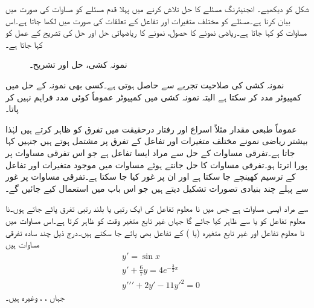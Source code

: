 شکل  کو دیکھیے۔ انجنیئرنگ مسئلے کا حل تلاش کرنے میں پہلا قدم مسئلے کو مساوات کی صورت میں بیان کرنا ہے۔مسئلے کو مختلف متغیرات اور تفاعل کے تعلقات کی صورت میں لکھا جاتا ہے۔اس مساوات کو  کہا جاتا ہے۔ریاضی نمونے کا حصول، نمونے کا ریاضیاتی حل اور حل کی تشریح کے عمل کو  کہا جاتا ہے۔
\begin{figure}
\centering
{}
\caption{نمونہ کشی، حل اور تشریح۔}
\label{شکل_سادہ_اول_نمونہ_کشی_عمل_الف}
\end{figure}
نمونہ کشی کی صلاحیت تجربے سے حاصل ہوتی ہے۔کسی بھی نمونہ کے حل میں کمپیوٹر مدد کر سکتا ہے البتہ نمونہ کشی میں کمپیوٹر عموماً کوئی مدد فراہم نہیں کر پاتا۔

عموماً طبعی مقدار مثلاً اسراع اور رفتار درحقیقت میں تفرق کو ظاہر کرتے ہیں لہٰذا بیشتر ریاضی نمونے مختلف متغیرات اور تفاعل کے تفرق پر مشتمل ہوتے ہیں جنہیں  کہا جاتا ہے۔تفرقی مساوات کے حل سے مراد ایسا تفاعل ہے جو اس تفرقی مساوات پر پورا اترتا ہو۔تفرقی مساوات کا حل جانتے ہوئے مساوات میں موجود متغیرات اور تفاعل کے ترسیم کھینچے جا سکتا ہے اور ان پر غور کیا جا سکتا ہے۔تفرقی مساوات پر غور سے پہلے چند بنیادی تصورات تشکیل دیتے ہیں جو اس باب میں استعمال کیے جائیں گے۔


 سے مراد ایسی مساوات ہے جس میں نا معلوم تفاعل کی ایک رتبی یا بلند رتبی تفرق پائے جاتے ہوں۔نا معلوم تفاعل کو  یا  سے ظاہر کیا جائے گا جہاں غیر تابع متغیر  وقت کو ظاہر کرتا ہے۔اس مساوات میں نا معلوم تفاعل  اور غیر تابع متغیرہ  (یا ) کے تفاعل بھی پائے جا سکتے ہیں۔درج ذیل چند سادہ تفرقی مساوات ہیں
\begin{align}
&y'=\sin x \label{مساوات_سادہ_اول_اول_درجہ}\\
&y'+\frac{6}{7}y=4e^{-\frac{3}{2}x} \label{مساوات_سادہ_اول_دوسرا_درجہ}\\
&y'\!'\!'+2y'-11y'^2=0 \label{مساوات_سادہ_اول_تیسرا_درجہ}
\end{align}
جہاں ، ، وغیرہ ہیں۔

